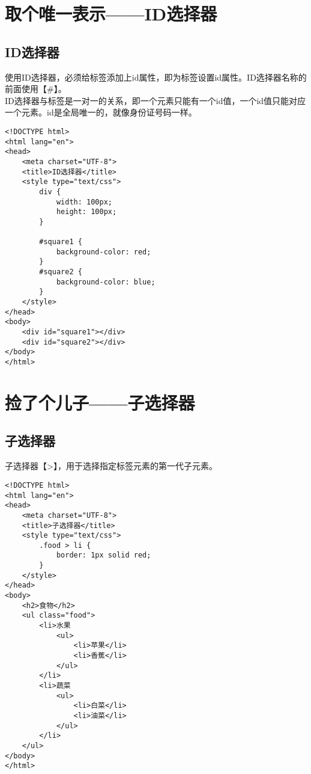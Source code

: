 \newpage

\section{取个唯一表示——ID选择器}

\subsection{ID选择器}

使用ID选择器，必须给标签添加上id属性，即为标签设置id属性。ID选择器名称的前面使用【\#】。 \\

ID选择器与标签是一对一的关系，即一个元素只能有一个id值，一个id值只能对应一个元素。id是全局唯一的，就像身份证号码一样。

\begin{lstlisting}[style=htmlcssjs, title=ID选择器]
<!DOCTYPE html>
<html lang="en">
<head>
    <meta charset="UTF-8">
    <title>ID选择器</title>
    <style type="text/css">
        div {
            width: 100px;
            height: 100px;
        }

        #square1 {
            background-color: red;
        }
        #square2 {
            background-color: blue;
        }
    </style>
</head>
<body>
    <div id="square1"></div>
    <div id="square2"></div>
</body>
</html>
\end{lstlisting}

\newpage

\section{捡了个儿子——子选择器}

\subsection{子选择器}

子选择器【>】，用于选择指定标签元素的第一代子元素。

\begin{lstlisting}[style=htmlcssjs, title=子选择器]
<!DOCTYPE html>
<html lang="en">
<head>
    <meta charset="UTF-8">
    <title>子选择器</title>
    <style type="text/css">
        .food > li {
            border: 1px solid red;
        }
    </style>
</head>
<body>
    <h2>食物</h2>
    <ul class="food">
        <li>水果
            <ul>
                <li>苹果</li>
                <li>香蕉</li>
            </ul>
        </li>
        <li>蔬菜
            <ul>
                <li>白菜</li>
                <li>油菜</li>
            </ul>
        </li>
    </ul>
</body>
</html>
\end{lstlisting}

